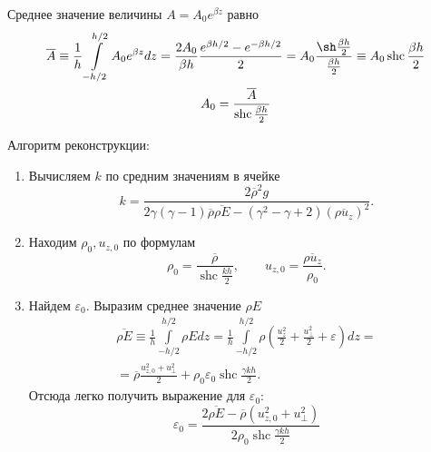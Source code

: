 \documentclass[12pt]{article}
\begin{document}
Среднее значение величины $A = A_0 e^{\beta z}$ равно
\[
\begin{gathered}
\overline{A} \equiv \frac{1}{h} \int\limits_{-h/2}^{h/2} A_0 e^{\beta z} dz = \frac{2A_0}{\beta h} 
\frac{e^{\beta h/2} - e^{-\beta h/2}}{2} = A_0 \frac{\sh \frac{\beta h}{2}}{\frac{\beta h}{2}} 
\equiv A_0 \operatorname{shc} 
\frac{\beta h}{2}\\
A_0 = \frac{\overline{A}}{\operatorname{shc} \frac{\beta h}{2}}
\end{gathered}
\]

Алгоритм реконструкции:
\begin{enumerate}
\item Вычисляем $k$ по средним значениям в ячейке
\[
k = \frac{2\overline\rho^2 g}{2\gamma(\gamma-1)\overline\rho\overline{\rho E} - (\gamma^2 - \gamma 
+ 2) (\overline{\rho u_z})^2}.
\]
\item Находим $\rho_0, u_{z,0}$ по формулам
\[
\rho_0 = \frac{\overline{\rho}}{\operatorname{shc} \frac{kh}{2}}, \qquad u_{z,0} = 
\frac{\overline{\rho 
u_z}}{\rho_0}.
\]
\item Найдем $\varepsilon_0$. Выразим среднее значение $\rho E$
\begin{multline*}
\overline{\rho E} \equiv
\frac{1}{h}\int\limits_{-h/2}^{h/2} \rho E dz = 
\frac{1}{h}\int\limits_{-h/2}^{h/2} \rho \left(\frac{u_z^2}{2} + \frac{u_\bot^2}{2} + 
\varepsilon\right) dz = \\ = \overline{\rho} \frac{u_{z,0}^2 + u_\bot^2}{2}
+\rho_0\varepsilon_0 \operatorname{shc} \frac{\gamma k h}{2}.
\end{multline*}
Отсюда легко получить выражение для $\varepsilon_0$:
\[
\varepsilon_0 = \frac{2\overline{\rho E} - \overline{\rho} (u_{z,0}^2 + u_{\bot}^2)}{2\rho_0 
\operatorname{shc} \frac{\gamma kh}{2}}
\]
\end{enumerate}
\end{document}
